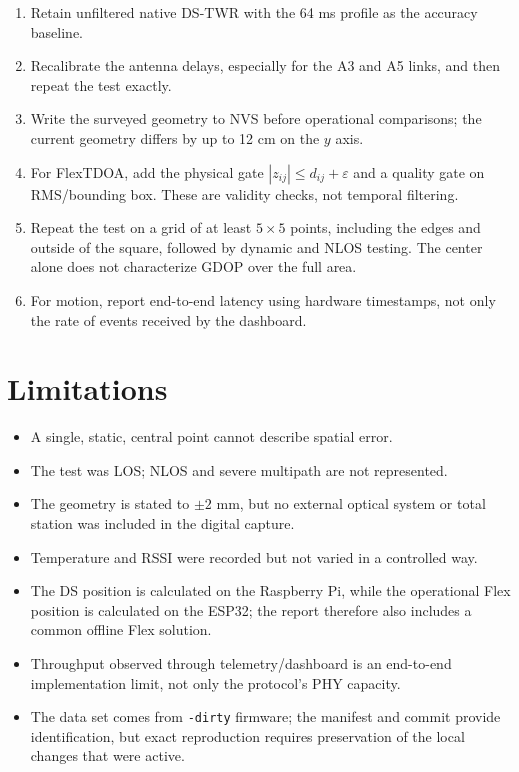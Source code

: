 \documentclass[11pt,a4paper]{article}
\begin{document}
\begin{enumerate}[leftmargin=7mm]
  \item Retain unfiltered native DS-TWR with the 64 ms profile as the accuracy
  baseline.
  \item Recalibrate the antenna delays, especially for the A3 and A5 links,
  and then repeat the test exactly.
  \item Write the surveyed geometry to NVS before operational comparisons;
  the current geometry differs by up to 12 cm on the $y$ axis.
  \item For FlexTDOA, add the physical gate
  $|z_{ij}|\leq d_{ij}+\varepsilon$ and a quality gate on RMS/bounding box.
  These are validity checks, not temporal filtering.
  \item Repeat the test on a grid of at least $5\times5$ points, including the
  edges and outside of the square, followed by dynamic and NLOS testing. The
  center alone does not characterize GDOP over the full area.
  \item For motion, report end-to-end latency using hardware timestamps, not
  only the rate of events received by the dashboard.
\end{enumerate}

\section{Limitations}

\begin{itemize}[leftmargin=6mm]
  \item A single, static, central point cannot describe spatial error.
  \item The test was LOS; NLOS and severe multipath are not represented.
  \item The geometry is stated to $\pm2$ mm, but no external optical system or
  total station was included in the digital capture.
  \item Temperature and RSSI were recorded but not varied in a controlled way.
  \item The DS position is calculated on the Raspberry Pi, while the
  operational Flex position is calculated on the ESP32; the report therefore
  also includes a common offline Flex solution.
  \item Throughput observed through telemetry/dashboard is an end-to-end
  implementation limit, not only the protocol's PHY capacity.
  \item The data set comes from \texttt{-dirty} firmware; the manifest and
  commit provide identification, but exact reproduction requires preservation
  of the local changes that were active.
\end{itemize}
\end{document}
